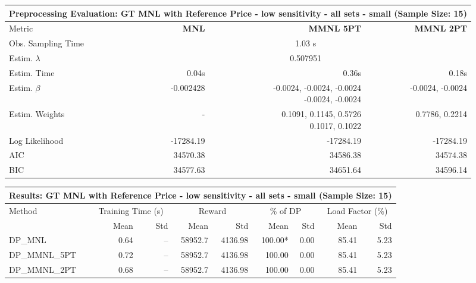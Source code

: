 
\begin{samepage}
\begin{center}
  \small
  \begin{tabular}{l|r|r|r}
    \toprule
    \multicolumn{4}{c}{\textbf{Preprocessing Evaluation: GT MNL with Reference Price - low sensitivity - all sets - small (Sample Size: 15)}} \\
    \midrule
    Metric & \textbf{MNL} & \textbf{MMNL 5PT} & \textbf{MMNL 2PT} \\
    \midrule
    Obs. Sampling Time & \multicolumn{3}{c}{1.03 s} \\
    Estim. $\lambda$ & \multicolumn{3}{c}{0.507951} \\
    Estim. Time & 0.04s & 0.36s & 0.18s \\
    Estim. $\beta$ & -0.002428 & \makecell[tr]{-0.0024, -0.0024, -0.0024 \\ -0.0024, -0.0024} & -0.0024, -0.0024 \\
    Estim. Weights & - & \makecell[tr]{0.1091, 0.1145, 0.5726 \\ 0.1017, 0.1022} & 0.7786, 0.2214 \\
    Log Likelihood & -17284.19 & -17284.19 & -17284.19 \\
    AIC & 34570.38 & 34586.38 & 34574.38 \\
    BIC & 34577.63 & 34651.64 & 34596.14 \\
    \bottomrule
  \end{tabular}
\end{center}
\begin{center}
  \small
  \begin{tabular}{l|rr|rr|rr|rr}
    \toprule
    \multicolumn{9}{c}{\textbf{Results: GT MNL with Reference Price - low sensitivity - all sets - small (Sample Size: 15)}} \\
    \midrule
    Method & \multicolumn{2}{c|}{Training Time (s)} & \multicolumn{2}{c|}{Reward} & \multicolumn{2}{c|}{\% of DP} & \multicolumn{2}{c}{Load Factor (\%)} \\
    & Mean & Std & Mean & Std & Mean & Std & Mean & Std \\
    \midrule
    DP\_MNL      &     0.64 &    -- &    58952.7 &    4136.98 & 100.00* &    0.00 &   85.41 &    5.23 \\
    DP\_MMNL\_5PT &     0.72 &    -- &    58952.7 &    4136.98 &  100.00 &    0.00 &   85.41 &    5.23 \\
    DP\_MMNL\_2PT &     0.68 &    -- &    58952.7 &    4136.98 &  100.00 &    0.00 &   85.41 &    5.23 \\

\end{tabular}
\end{center}
\end{samepage}
